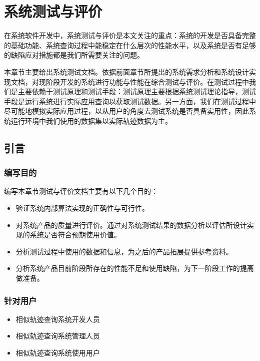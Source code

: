 

\chapter{系统测试与评价}
\label{chap:evaluation}
在系统软件开发中，系统测试与评价是本文关注的重点：系统的开发是否具备完整的基础功能、系统查询过程中能稳定在什么层次的性能水平，以及系统是否有足够的缺陷应对措施都是我们所需要关注的问题。

本章节主要给出系统测试文档。依据前面章节所提出的系统需求分析和系统设计实现文档，对现阶段开发的系统进行功能与性能在综合测试与评价。在测试过程中我们是主要依赖于测试原理和测试手段：测试原理主要根据系统测试理论指导，测试手段是运行系统进行实际应用查询以获取测试数据。另一方面，我们在测试过程中尽可能地模拟实际应用过程，以从用户的角度去测试系统是否具备实用性，因此系统运行环境中我们使用的数据集以实际轨迹数据为主。

\section{引言}
\label{sec:evaluation introduction}

\subsection{编写目的}
\label{subsec:purpose}
编写本章节测试与评价文档主要有以下几个目的：
\begin{itemize}
	\item 验证系统内部算法实现的正确性与可行性。
	\item 对系统产品的质量进行评价。通过对系统测试结果的数据分析以评估所设计实现的系统是否符合预期使用价值。
	\item 分析测试过程中使用的数据和信息，为之后的产品拓展提供参考资料。
	\item 分析系统产品目前阶段所存在的性能不足和使用缺陷，为下一阶段工作的提高做准备。
\end{itemize}

\subsection{针对用户}
\label{subsec:people}
\begin{itemize}
	\item 相似轨迹查询系统开发人员
	\item 相似轨迹查询系统管理人员
	\item 相似轨迹查询系统使用用户
\end{itemize}

